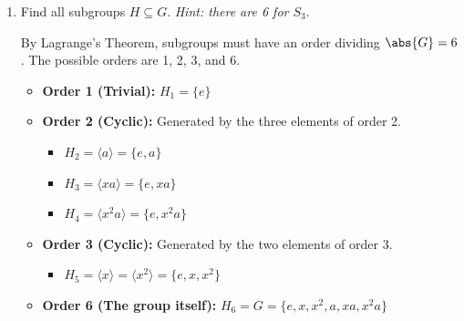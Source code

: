 \begin{enumerate}
\begin{enumerate}
    \item Find all subgroups $H \subseteq G$. \textit{Hint: there are 6 for $S_3$}.
    \begin{subanswer}
      By Lagrange's Theorem, subgroups must have an order dividing $\abs{G}=6$. The possible orders are 1, 2, 3, and 6.
      \begin{itemize}
        \item \textbf{Order 1 (Trivial):} $H_1 = \{e\}$
        \item \textbf{Order 2 (Cyclic):} Generated by the three elements of order 2.
        \begin{itemize}
          \item $H_2 = \langle a \rangle = \{e, a\}$
          \item $H_3 = \langle xa \rangle = \{e, xa\}$
          \item $H_4 = \langle x^2a \rangle = \{e, x^2a\}$
        \end{itemize}
        \item \textbf{Order 3 (Cyclic):} Generated by the two elements of order 3.
        \begin{itemize}
          \item $H_5 = \langle x \rangle = \langle x^2 \rangle = \{e, x, x^2\}$
        \end{itemize}
        \item \textbf{Order 6 (The group itself):} $H_6 = G = \{e, x, x^2, a, xa, x^2a\}$
      \end{itemize}
    \end{subanswer}


\end{enumerate}
\end{enumerate}
